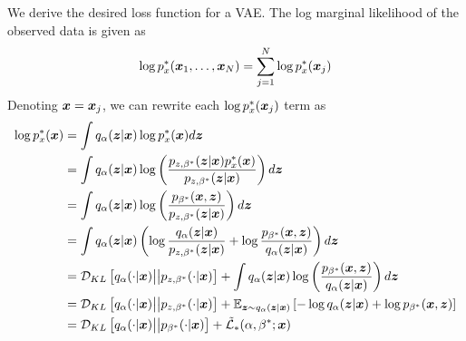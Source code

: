 We derive the desired loss function for a VAE. The log marginal likelihood of the observed data is given as
\begin{equation}
  \log p_x^*(\boldsymbol{x}_1,\ldots,\boldsymbol{x}_N) = \sum_{j=1}^N \log p_x^*(\boldsymbol{x}_j)
  \label{eq:vae_marginal}
\end{equation}
Denoting $\boldsymbol{x} = \boldsymbol{x}_j$, we can rewrite each $\log p_x^*(\boldsymbol{x}_j)$ term as 
\begin{equation}
  \begin{split}
    \log p_x^*(\boldsymbol{x}) &= \int q_\alpha(\boldsymbol{z} |\boldsymbol{x}) \log p_x^*(\boldsymbol{x})d\boldsymbol{z} \\
    &= \int q_\alpha(\boldsymbol{z} | \boldsymbol{x}) \log \left( \frac{p_{z,\beta^*}(\boldsymbol{z} | \boldsymbol{x}) p_x^*(\boldsymbol{x})}{p_{z,\beta^*}(\boldsymbol{z} | \boldsymbol{x})} \right) d\boldsymbol{z}  \\
    &= \int q_\alpha(\boldsymbol{z} | \boldsymbol{x}) \log \left( \frac{p_{\beta^*}(\boldsymbol{x}, \boldsymbol{z})}{p_{z,\beta^*}(\boldsymbol{z} | \boldsymbol{x})} \right) d\boldsymbol{z}\\
    &= \int q_\alpha(\boldsymbol{z} | \boldsymbol{x}) \left( \log \frac{q_\alpha(\boldsymbol{z} | \boldsymbol{x})}{p_{z,\beta^*}(\boldsymbol{z} | \boldsymbol{x})} + \log \frac{p_{\beta^*}(\boldsymbol{x}, \boldsymbol{z})}{q_\alpha(\boldsymbol{z} | \boldsymbol{x})}\right) d\boldsymbol{z} \\
    &= \mathcal{D}_{KL}\left[ q_\alpha(\cdot |\boldsymbol{x}) \big|\big| p_{z,\beta^*}(\cdot | \boldsymbol{x}) \right] + \int q_\alpha(\boldsymbol{z} | \boldsymbol{x}) \log \left( \frac{p_{\beta^*}(\boldsymbol{x}, \boldsymbol{z})}{q_\alpha(\boldsymbol{z} | \boldsymbol{x})} \right)d\boldsymbol{z} \\
    &= \mathcal{D}_{KL}\left[ q_\alpha(\cdot |\boldsymbol{x}) \big|\big| p_{z,\beta^*}(\cdot | \boldsymbol{x}) \right] + {\displaystyle\mathbb{E}_{\boldsymbol{z}\sim q_\alpha(\boldsymbol{z} | \boldsymbol{x})}}\left[ -\log q_\alpha(\boldsymbol{z} | \boldsymbol{x}) + \log p_{\beta^*}(\boldsymbol{x}, \boldsymbol{z}) \right] \\
    &= \mathcal{D}_{KL}\left[ q_\alpha(\cdot |\boldsymbol{x}) \big|\big| p_{\beta^*}(\cdot | \boldsymbol{x}) \right] + \tilde{\mathcal{L}}_*(\alpha, \beta^*; \boldsymbol{x})
\label{eq:vae_derive}
  \end{split}
\end{equation}

